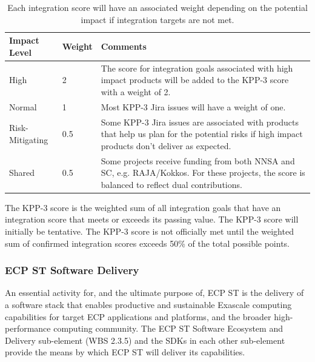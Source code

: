 \begin{table}[h!]
	\begin{tabular}{|L{1.0in}|L{0.5in}|L{4.5in}|}\hline
		Impact Level & Weight & Comments\\\hline
		High & 2 & The score for integration goals associated with high impact products will be added to the KPP-3 score with a weight of 2.\\\hline
		Normal & 1 & Most KPP-3 Jira issues will have a weight of one.\\\hline
		Risk-Mitigating & 0.5 & Some KPP-3 Jira issues are associated with products that help us plan for the potential risks if high impact products don’t deliver as expected.\\\hline
		Shared  & 0.5 & Some projects receive funding from both NNSA and SC, e.g. RAJA/Kokkos. For these projects, the score is balanced to reflect dual contributions.\\\hline
	\end{tabular}
	\caption{\label{table:KPP-3-impact} Each integration score will have an associated weight depending on the potential impact if integration targets are not met.}
\end{table}

The KPP-3 score is the weighted sum of all integration goals that have an integration score that meets or exceeds its passing value. 
The KPP-3 score will initially be tentative.  The KPP-3 score is not officially met until the weighted sum of confirmed integration scores exceeds 50\% of the total possible points.


\subsubsection{ECP ST Software Delivery}
An essential activity for, and the ultimate purpose of, ECP ST is the delivery of a software stack that enables productive and sustainable Exascale computing capabilities for target ECP applications and platforms, and the broader high-performance computing community. The ECP ST Software Ecosystem and Delivery sub-element (WBS 2.3.5) and the SDKs in each other sub-element provide the means by which ECP ST will deliver its capabilities.
